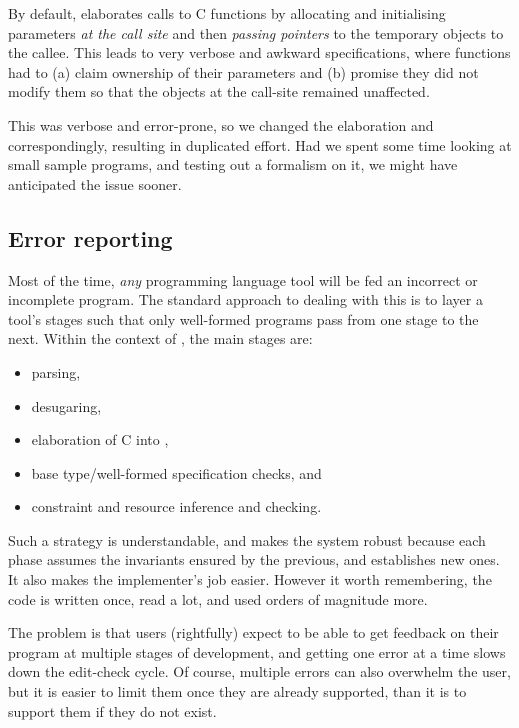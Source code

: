 By default,  elaborates calls to C functions by allocating and
initialising parameters \emph{at the call site} and then \emph{passing
pointers} to the temporary objects to the callee. This leads to very verbose
and awkward specifications, where functions had to (a) claim ownership of their
parameters and (b) promise they did not modify them so that the objects at the
call-site remained unaffected.

This was verbose and error-prone, so we changed the
elaboration and  correspondingly, resulting in duplicated effort. Had we spent some
time looking at small sample  programs, and testing out a formalism on
it, we might have anticipated the issue sooner.

\subsection{Error reporting}

Most of the time, \emph{any} programming language tool will be fed an incorrect
or incomplete program. The standard approach to dealing with this is to layer
a tool's stages such that only well-formed programs pass from one stage to
the next. Within the context of , the main stages are:
\begin{itemize}
    \item parsing,
    \item desugaring,
    \item elaboration of C into ,
    \item base type/well-formed specification checks, and
    \item {} constraint and resource inference and checking.
\end{itemize}

Such a strategy is understandable, and makes the system robust because each
phase assumes the invariants ensured by the previous, and establishes new ones.
It also makes the implementer's job easier. However it worth remembering, the
code is written once, read a lot, and used orders of magnitude more.

The problem is that users (rightfully) expect to be able to get feedback on
their program at multiple stages of development, and getting one error at a
time slows down the edit-check cycle. Of course, multiple errors can also
overwhelm the user, but it is easier to limit them once they are already
supported, than it is to support them if they do not exist.


